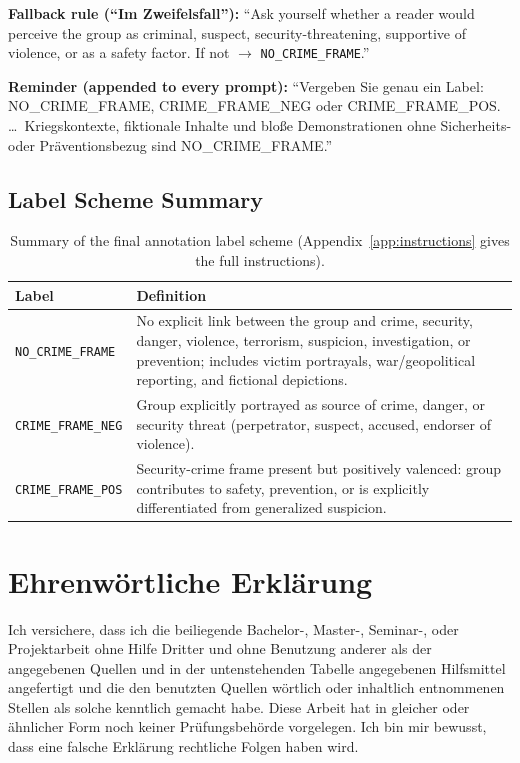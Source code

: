 \documentclass[a4paper,oneside,bibliography=totoc]{scrartcl}
\begin{document}
\begin{instructionbox}
\medskip
\textbf{Fallback rule (\enquote{Im Zweifelsfall}):} \enquote{Ask yourself whether a reader would perceive the group as criminal, suspect, security-threatening, supportive of violence, or as a safety factor. If not $\rightarrow$ \texttt{NO\_CRIME\_FRAME}.}

\medskip
\textbf{Reminder (appended to every prompt):} \enquote{Vergeben Sie genau ein Label: NO\_CRIME\_FRAME, CRIME\_FRAME\_NEG oder CRIME\_FRAME\_POS. \dots\ Kriegskontexte, fiktionale Inhalte und blo{\ss}e Demonstrationen ohne Sicherheits- oder Pr\"aventionsbezug sind NO\_CRIME\_FRAME.}
\end{instructionbox}

\subsection{Label Scheme Summary}
\label{app:codebook}

\begin{table}[htbp]
\centering
\begin{tabularx}{\textwidth}{lX}
\toprule
\textbf{Label} & \textbf{Definition} \\
\midrule
\texttt{NO\_CRIME\_FRAME} & No explicit link between the group and crime, security, danger, violence, terrorism, suspicion, investigation, or prevention; includes victim portrayals, war/geopolitical reporting, and fictional depictions. \\
\texttt{CRIME\_FRAME\_NEG} & Group explicitly portrayed as source of crime, danger, or security threat (perpetrator, suspect, accused, endorser of violence). \\
\texttt{CRIME\_FRAME\_POS} & Security-crime frame present but positively valenced: group contributes to safety, prevention, or is explicitly differentiated from generalized suspicion. \\
\bottomrule
\end{tabularx}
\caption{Summary of the final annotation label scheme (Appendix~\ref{app:instructions} gives the full instructions).}
\end{table}

\clearpage
\section*{Ehrenw\"ortliche Erkl\"arung}

Ich versichere, dass ich die beiliegende Bachelor-, Master-, Seminar-, oder Projektarbeit ohne Hilfe Dritter und ohne Benutzung anderer als der angegebenen Quellen und in der untenstehenden Tabelle angegebenen Hilfsmittel angefertigt und die den benutzten Quellen w\"ortlich oder inhaltlich entnommenen Stellen als solche kenntlich gemacht habe. Diese Arbeit hat in gleicher oder \"ahnlicher Form noch keiner Pr\"ufungsbeh\"orde vorgelegen. Ich bin mir bewusst, dass eine falsche Erkl\"arung rechtliche Folgen haben wird.
\end{document}
